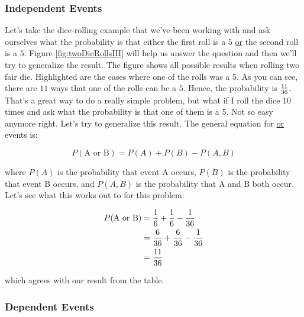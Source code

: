 \subsubsection*{Independent Events}
Let's take the dice-rolling example that we've been working with and
ask ourselves what the probability is that either the first roll
is a $5$ \underline{or} the second roll is a $5$.  Figure
\ref{fig:twoDieRollsIII} will help us answer the question and then
we'll try to generalize the result.  The figure shows all possible
results when rolling two fair die.  Highlighted are the cases where
one of the rolls was a 5.  As you can see, there are $11$ ways that
one of the rolls can be a $5$.  Hence, the probability is ${11\over
  36}$.  That's a great way to do a really simple problem, but what if
 I roll the dice 10 times and ask what the probability is that one of
 them is a 5.  Not so easy anymore right.  Let's try to generalize
 this result.  The general equation for \underline{or} events is:

 \begin{equation}
   P(\text{A or B}) = P(A) + P(B) - P(A,B)\label{eq:orevents}
\end{equation}
 
where $P(A)$ is the probability that event A occurs, $P(B)$ is the
probability that event B occurs, and $P(A,B)$ is the probability that
A and B both occur. Let's see what this works out to for this problem:


 \begin{align}
   P(\text{A or B}) &= {1\over 6} + {1\over 6} - {1\over 36}\\
                    &= {6\over 36} + {6\over 36} - {1\over 36}\\
                    &= {11\over 36}\\
 \end{align}

 which agrees with our result from the table.

 \subsubsection*{Dependent Events}

